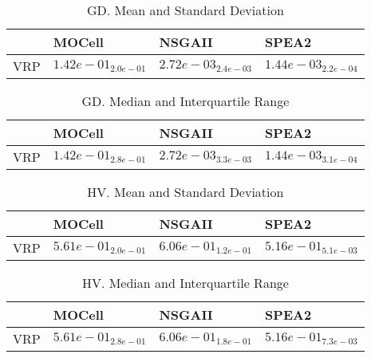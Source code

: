 \documentclass{article}
\begin{document}
\begin{table}
\caption{GD. Mean and Standard Deviation}
\label{table: GD}
\centering
\begin{scriptsize}
\begin{tabular}{llll}
\hline & MOCell & NSGAII &  SPEA2\\
\hline 
VRP & $  1.42e-01_{ 2.0e-01}$ & \cellcolor{gray25}$  2.72e-03_{ 2.4e-03}$ & \cellcolor{gray95}$  1.44e-03_{ 2.2e-04}$ \\
\hline
\end{tabular}
\end{scriptsize}
\end{table}

\begin{table}
\caption{GD. Median and Interquartile Range}
\label{table: GD}
\centering
\begin{scriptsize}
\begin{tabular}{llll}
\hline & MOCell & NSGAII &  SPEA2\\
\hline 
VRP & $  1.42e-01_{ 2.8e-01}$ & \cellcolor{gray25}$  2.72e-03_{ 3.3e-03}$ & \cellcolor{gray95}$  1.44e-03_{ 3.1e-04}$ \\
\hline
\end{tabular}
\end{scriptsize}
\end{table}

\begin{table}
\caption{HV. Mean and Standard Deviation}
\label{table: HV}
\centering
\begin{scriptsize}
\begin{tabular}{llll}
\hline & MOCell & NSGAII &  SPEA2\\
\hline 
VRP & \cellcolor{gray25}$  5.61e-01_{ 2.0e-01}$ & \cellcolor{gray95}$  6.06e-01_{ 1.2e-01}$ & $  5.16e-01_{ 5.1e-03}$ \\
\hline
\end{tabular}
\end{scriptsize}
\end{table}

\begin{table}
\caption{HV. Median and Interquartile Range}
\label{table: HV}
\centering
\begin{scriptsize}
\begin{tabular}{llll}
\hline & MOCell & NSGAII &  SPEA2\\
\hline 
VRP & \cellcolor{gray25}$  5.61e-01_{ 2.8e-01}$ & \cellcolor{gray95}$  6.06e-01_{ 1.8e-01}$ & $  5.16e-01_{ 7.3e-03}$ \\
\hline
\end{tabular}
\end{scriptsize}
\end{table}
\end{document}
